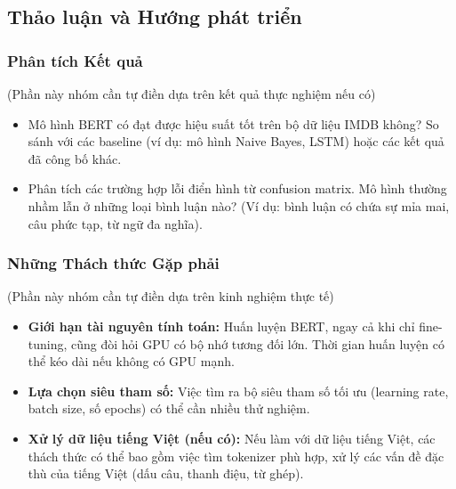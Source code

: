\subsection{Thảo luận và Hướng phát triển}
\label{ssec:thao_luan_huong_phat_trien_sa}
\subsubsection{Phân tích Kết quả}
(Phần này nhóm cần tự điền dựa trên kết quả thực nghiệm nếu có)
\begin{itemize}
    \item Mô hình BERT có đạt được hiệu suất tốt trên bộ dữ liệu IMDB không? So sánh với các baseline (ví dụ: mô hình Naive Bayes, LSTM) hoặc các kết quả đã công bố khác.
    \item Phân tích các trường hợp lỗi điển hình từ confusion matrix. Mô hình thường nhầm lẫn ở những loại bình luận nào? (Ví dụ: bình luận có chứa sự mỉa mai, câu phức tạp, từ ngữ đa nghĩa).
\end{itemize}

\subsubsection{Những Thách thức Gặp phải}
(Phần này nhóm cần tự điền dựa trên kinh nghiệm thực tế)
\begin{itemize}
    \item \textbf{Giới hạn tài nguyên tính toán:} Huấn luyện BERT, ngay cả khi chỉ fine-tuning, cũng đòi hỏi GPU có bộ nhớ tương đối lớn. Thời gian huấn luyện có thể kéo dài nếu không có GPU mạnh.
    \item \textbf{Lựa chọn siêu tham số:} Việc tìm ra bộ siêu tham số tối ưu (learning rate, batch size, số epochs) có thể cần nhiều thử nghiệm.
    \item \textbf{Xử lý dữ liệu tiếng Việt (nếu có):} Nếu làm với dữ liệu tiếng Việt, các thách thức có thể bao gồm việc tìm tokenizer phù hợp, xử lý các vấn đề đặc thù của tiếng Việt (dấu câu, thanh điệu, từ ghép).
\end{itemize}

